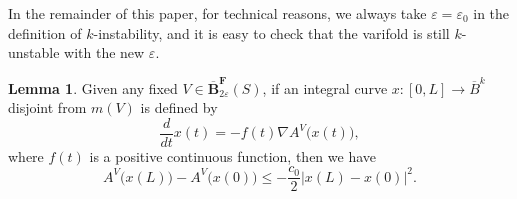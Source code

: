 \documentclass[12pt,english]{article}
\theoremstyle{definition}
\newtheorem{lemma}[theorem]{Lemma}
\begin{document}
In the remainder of this paper, for technical reasons, we always take $\varepsilon = \varepsilon_0$ in the definition of $k$-instability, and it is easy to check that the varifold is still $k$-unstable with the new $\varepsilon$.
\begin{lemma}
\label{lem:grad}
    Given any fixed $V \in \mathbf{\overline{B}}^{\textbf{F}}_{2\varepsilon}(S)$, if an integral curve $x: [0, L] \rightarrow \overline{B}^k$ disjoint from $m(V)$ is defined by
    \begin{equation*}
        \frac{d}{dt} x(t) = - f(t) \nabla A^V\bigl(x(t)\bigr),
    \end{equation*}
    where $f(t)$ is a positive continuous function, then we have
    \begin{equation*}
        A^V\bigl(x(L)\bigr) - A^V\bigl(x(0)\bigr) \leq - \frac{c_0}{2} |x(L) - x(0)|^2.
    \end{equation*}
\end{lemma}
\end{document}
